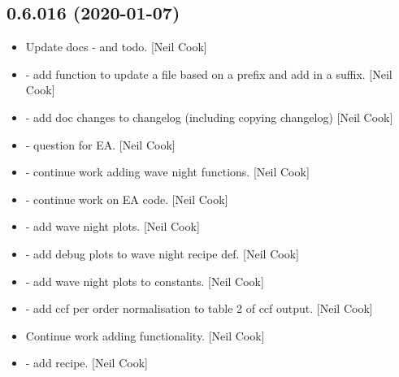 \documentclass[a4paper,10pt,english]{report}
\begin{document}
\subsection{0.6.016 (2020-01-07)}
\label{\detokenize{misc/changelog:id3}}\begin{itemize}
\item {} 
Update docs -  and todo. {[}Neil Cook{]}

\item {} 
 - add function to update a
file based on a prefix and add in a suffix. {[}Neil Cook{]}

\item {} 
 - add doc changes to changelog
(including copying changelog) {[}Neil Cook{]}

\item {} 
 - question for EA. {[}Neil Cook{]}

\item {} 
 - continue work adding wave night functions.
{[}Neil Cook{]}

\item {} 
 - continue work on EA code.
{[}Neil Cook{]}

\item {} 
 - add wave night plots. {[}Neil Cook{]}

\item {} 
 - add debug plots to
wave night recipe def. {[}Neil Cook{]}

\item {} 
 - add wave night plots to
constants. {[}Neil Cook{]}

\item {} 
 - add ccf per order normalisation to table
2 of ccf output. {[}Neil Cook{]}

\item {} 
Continue work adding  functionality. {[}Neil Cook{]}

\item {} 
 - add 
recipe. {[}Neil Cook{]}


\end{itemize}
\end{document}

